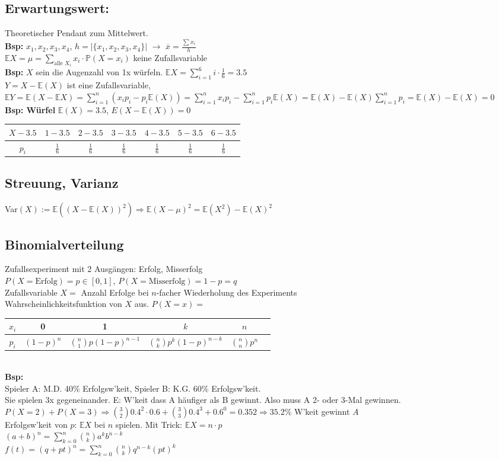 \documentclass[a4paper,10pt]{article}
\newcommand{\PN}{\mathbb{P}}
\newcommand{\EN}{\mathbb{E}}
\newcommand{\Bold}[1]{\textbf{#1}} %
\newcommand{\T}[1]{\text{#1}} %
\newcommand{\ra}{\rightarrow}
\newcommand{\Ra}{\Rightarrow}
\newcommand{\Abs}[1]{\left| #1 \right|} %
\newcommand{\Sumz}[2]{\sum_{#2=0}^{#1}} %
\newcommand{\Sum}[2]{\sum_{#2}^{#1}} %
\begin{document}
\subsection{Erwartungswert:}
Theoretischer Pendant zum Mittelwert.\\
\Bold{Bsp:} $x_1,x_2,x_3,x_4$, $h=\Abs{\{x_1,x_2,x_3,x_4\}}$ $\ra$ $\overline{x}=\frac{\Sum{}{}x_i}{h}$\\
$\EN X=\mu=\Sum{}{\T{alle }X_i}x_i\cdot\PN(X=x_i)$ keine Zufallsvariable\\
\Bold{Bsp:} $X$ sein die Augenzahl von 1x würfeln. $\EN X=\Sum{6}{i=1}i\cdot \frac{1}{6}=3.5$\\
$Y=X-\EN(X)$ ist eine Zufallsvariable, $\EN Y=\EN(X-\EN X)=\Sum{n}{i=1}(x_i p_i-p_i\EN(X))=\Sum{n}{i=1}x_ip_i-\Sum{n}{i=1}p_i\EN(X)=\EN(X)-\EN(X)\Sum{n}{i=1}p_i=\EN(X)-\EN(X)=0$\\
\Bold{Bsp: Würfel} $\EN(X)=3.5$, $E(X-\EN(X))=0$\\
\begin{tabular}{c|c|c|c|c|c|c}
 $X-3.5$&$1-3.5$&$2-3.5$&$3-3.5$&$4-3.5$&$5-3.5$&$6-3.5$\\\hline
 $p_i$&$\frac{1}{6}$&$\frac{1}{6}$&$\frac{1}{6}$&$\frac{1}{6}$&$\frac{1}{6}$&$\frac{1}{6}$
\end{tabular}
\subsection{Streuung, Varianz}
Var$(X):=\EN((X-\EN(X))^2) \Ra \EN(X-\mu)^2=\EN(X^2)-\EN(X)^2$
\subsection{Binomialverteilung}
Zufallsexperiment mit 2 Ausgängen: Erfolg, Misserfolg\\
$P(X=\T{Erfolg})=p\in[0,1]$, $P(X=\T{Misserfolg})=1-p=q$\\
Zufallsvariable $X=$ Anzahl Erfolge bei $n$-facher Wiederholung des Experiments\\
Wahrscheinlichkeitsfunktion von $X$ aus. $P(X=x)=$
\begin{tabular}{c|ccccc}
 $x_i$&0&1&$k$&$n$\\\hline
 $p_i$&$(1-p)^n$&${n\choose1}p(1-p)^{n-1}$&${n\choose k}p^k(1-p)^{n-k}$&${n\choose n}p^n$
\end{tabular}\\
\Bold{Bsp:}\\
Spieler A: M.D. 40\% Erfolgsw'keit, Spieler B: K.G. 60\% Erfolgsw'keit.\\
Sie spielen 3x gegeneinander. E: W'keit dass A häufiger als B gewinnt. Also muss A 2- oder 3-Mal gewinnen.
$P(X=2)+P(X=3)\Ra {3\choose2}0.4^2\cdot0.6+{3\choose3}0.4^3+0.6^0=0.352\Ra35.2$\% W'keit gewinnt $A$\\
Erfolgsw'keit von $p$: $\EN X$ bei $n$ spielen. Mit Trick: $\EN X=n\cdot p$\\
$(a+b)^n=\Sumz{n}{k}{n\choose k}a^kb^{n-k}$\\
$f(t)=(q+pt)^n=\Sumz{n}{k}{n\choose k}q^{n-k}(pt)^k$\\
\end{document}
